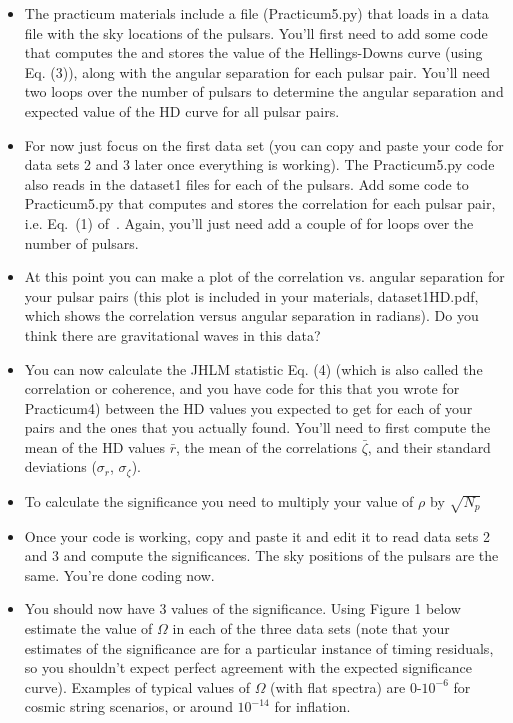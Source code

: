 \documentclass[prd,floatfix,preprintnumbers,amsmath,amssymb,nofootinbib,superscriptaddress]{revtex4}
\begin{document}
\begin{itemize}

\item The practicum materials include a file (Practicum5.py) that loads in a data file with the sky locations of the pulsars.
You'll first need to add some code that computes 
the and stores the value of the Hellings-Downs curve (using Eq. (3)), along with the angular 
separation for each pulsar pair.  You'll need 
two loops over the number of pulsars to determine the angular separation and expected value 
of the HD curve for all pulsar pairs.

\item For now just focus on the first data set (you can copy and paste your code for data sets 
2 and 3 later once everything is working). The Practicum5.py code also reads in the dataset1 files 
for each of the pulsars. Add some code to Practicum5.py that 
computes and stores the correlation for each pulsar pair, i.e. Eq.~(1) of~\cite{Jenet}. 
Again, you'll just need add a couple of for loops over the number of pulsars.

\item At this point you can make a plot of the correlation vs. angular separation for your 
pulsar pairs (this plot is included in your materials, dataset1HD.pdf, which shows the 
correlation versus angular separation in radians). Do you think there are gravitational 
waves in this data?

\item You can now calculate the JHLM statistic Eq. (4) (which is also called the correlation or coherence, 
and you have code for this that you wrote for Practicum4) 
between the HD values you expected to get for each of your pairs and the ones that you actually found.
You'll need to first compute the mean of the HD values $\bar r$, the mean of the correlations 
$\bar \zeta$, and their standard deviations ($\sigma_r$, $\sigma_\zeta$).  

\item To calculate the significance you need to multiply your value of $\rho$ by $\sqrt{N_p}$

\item Once your code is working, copy and paste it and edit it to read data sets 2 and 3 and 
compute the significances.  The sky positions of the pulsars are the same. You're done coding now.

\item You should now have 3 values of the significance.  Using Figure 1 below estimate the value of $\Omega$
in each of the three data sets (note that your estimates of the significance are for a particular instance
of timing residuals, so you shouldn't expect perfect agreement with the expected significance curve). 
Examples of typical values of $\Omega$ (with flat spectra) are $0$-$10^{-6}$ for cosmic string scenarios, 
or around $10^{-14}$ for inflation.


\end{itemize}
\end{document}
